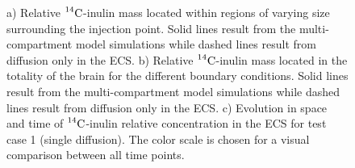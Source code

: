 \documentclass[10pt]{article}
\newcommand{\VV}[1]{\textcolor{red}{VV: #1}}
\newcommand{\1}{^{(1)}}
\newcommand{\2}{^{(2)}}
\newcommand{\Cinulin}{$\prescript{14}{}{\text{C}}$-inulin }
\newcommand{\commentout}[1]{}
\begin{document}
\commentout{
 \begin{figure}[htbp]
     \centering
     \begin{subfigure}[t]{0.45\textwidth}
         \captionsetup{width=0.9\textwidth}
         \centering
         \caption{Single diffusion equation}
         \label{fig:diffusion-samples-Inulin}
     \end{subfigure}
     \hfill
     \begin{subfigure}[t]{0.45\textwidth}
         \captionsetup{width=0.9\textwidth}
         \centering
         \caption{Multi-compartment model.}
         \label{fig:multi-compartment-samples-Inulin}
     \end{subfigure}
     \caption{Relative \Cinulin mass located within regions of varying size surrounding the injection point. \VV{Figures need axis labels}}
     \label{fig:samples-Inulin}
\end{figure}
}

\begin{figure}
    \centering
    \caption{a) Relative \Cinulin mass located within regions of varying size surrounding the injection point.  Solid lines result from the multi-compartment model simulations while dashed lines result from diffusion only in the ECS. b) Relative \Cinulin mass located in the totality of the brain for the different boundary conditions.  Solid lines result from the multi-compartment model simulations while dashed lines result from diffusion only in the ECS. c) Evolution in space and time of \Cinulin relative concentration in the ECS for test case 1 (single diffusion). The color scale is chosen for a visual comparison between all time points.}
    \label{fig:samples-Inulin}
\end{figure}

\end{document}
